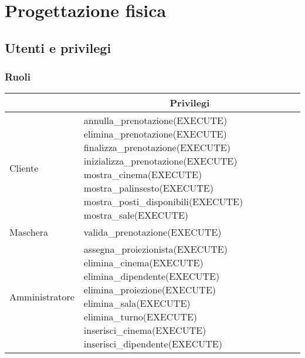 \section{Progettazione fisica}

\subsection*{Utenti e privilegi}
%
%

\subsubsection*{Ruoli}

\begin{tabularx}{\linewidth}{|X|p{12cm}|}
    \hline
    \rowcolor{tblhdrcolor}
    \multicolumn{1}{|c|}{\textbf{Nome}}
                   & \multicolumn{1}{|c|}{\textbf{Privilegi}}
    \\\hline
    Cliente        &
    annulla\_prenotazione(EXECUTE) \linebreak
    elimina\_prenotazione(EXECUTE) \linebreak
    finalizza\_prenotazione(EXECUTE) \linebreak
    inizializza\_prenotazione(EXECUTE) \linebreak
    mostra\_cinema(EXECUTE) \linebreak
    mostra\_palinsesto(EXECUTE) \linebreak
    mostra\_posti\_disponibili(EXECUTE) \linebreak
    mostra\_sale(EXECUTE)
    \\\hline
    Maschera       &
    valida\_prenotazione(EXECUTE)
    \\\hline
    Amministratore &
    assegna\_proiezionista(EXECUTE) \linebreak
    elimina\_cinema(EXECUTE) \linebreak
    elimina\_dipendente(EXECUTE) \linebreak
    elimina\_proiezione(EXECUTE) \linebreak
    elimina\_sala(EXECUTE) \linebreak
    elimina\_turno(EXECUTE) \linebreak
    inserisci\_cinema(EXECUTE) \linebreak
    inserisci\_dipendente(EXECUTE) \linebreak

\end{tabularx}
